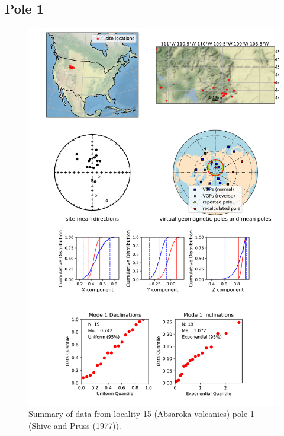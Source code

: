 \documentclass{article}
\begin{document}
\subsection{Pole 1}


\begin{figure}[H]
\centering
\includegraphics[width=5 in]{./15/1/pole_summary.png}
\caption{Summary of data from locality 15 (Absaroka volcanics) pole 1 (Shive and Pruss (1977)).}
\end{figure}
\end{document}
